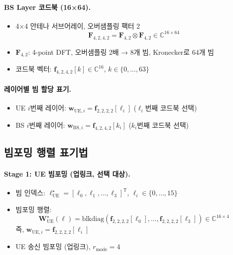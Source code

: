 \documentclass[10pt]{article}
\begin{document}
\paragraph{BS Layer 코드북 (16×64).}
\begin{itemize}
    \item 4×4 안테나 서브어레이, 오버샘플링 팩터 2
    \begin{equation}
    \mathbf{F}_{4,2,4,2} = \mathbf{F}_{4,2} \otimes \mathbf{F}_{4,2} \in \mathbb{C}^{16 \times 64}
    \end{equation}
    \item $\mathbf{F}_{4,2}$: 4-point DFT, 오버샘플링 2배 → 8개 빔, Kronecker로 64개 빔
    \item 코드북 벡터: $\mathbf{f}_{4,2,4,2}[k] \in \mathbb{C}^{16}$, $k \in \{0, \ldots, 63\}$
\end{itemize}

\paragraph{레이어별 빔 할당 표기.}
\begin{itemize}
    \item UE $i$번째 레이어: $\mathbf{w}_{\text{UE},i} = \mathbf{f}_{2,2,2,2}[\ell_i]$ ($\ell_i$번째 코드북 선택)
    \item BS $i$번째 레이어: $\mathbf{w}_{\text{BS},i} = \mathbf{f}_{4,2,4,2}[k_i]$ ($k_i$번째 코드북 선택)
\end{itemize}

\subsection{빔포밍 행렬 표기법}

\paragraph{Stage 1: UE 빔포밍 (업링크, 선택 대상).}
\begin{itemize}
    \item 빔 인덱스: $\boldsymbol{\ell}_{\text{UE}}^{\star} = [\ell_0, \ell_1, \ldots, \ell_3]^{\mathsf{T}}$, $\ell_i \in \{0, \ldots, 15\}$
    \item 빔포밍 행렬:
    \begin{equation}
    \mathbf{W}_{\text{UE}}^{\star}(\boldsymbol{\ell}) = \text{blkdiag}(\mathbf{f}_{2,2,2,2}[\ell_0], \ldots, \mathbf{f}_{2,2,2,2}[\ell_3]) \in \mathbb{C}^{16 \times 4}
    \end{equation}
    즉, $\mathbf{w}_{\text{UE},i} = \mathbf{f}_{2,2,2,2}[\ell_i]$
    \item UE 송신 빔포밍 (업링크), $r_{\text{mode}} = 4$
\end{itemize}
\end{document}
